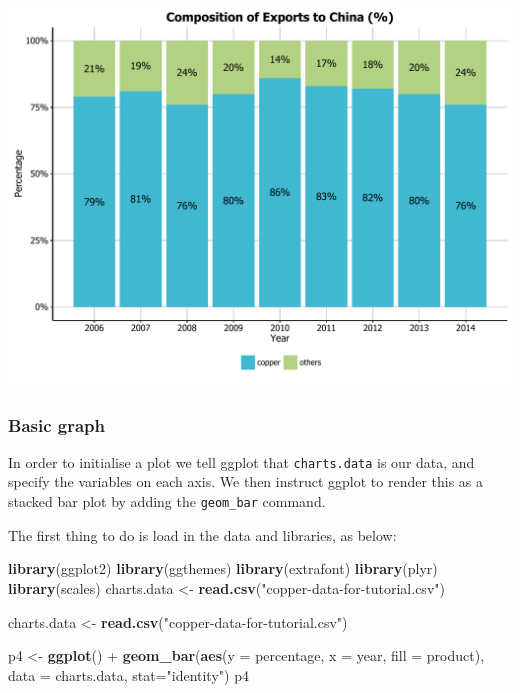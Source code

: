 \documentclass[]{article}
\newenvironment{Shaded}{\begin{snugshade}}{\end{snugshade}}
\newcommand{\KeywordTok}[1]{\textcolor[rgb]{0.13,0.29,0.53}{\textbf{{#1}}}}
\newcommand{\DataTypeTok}[1]{\textcolor[rgb]{0.13,0.29,0.53}{{#1}}}
\newcommand{\StringTok}[1]{\textcolor[rgb]{0.31,0.60,0.02}{{#1}}}
\newcommand{\NormalTok}[1]{{#1}}
\begin{document}
\begin{center}\includegraphics{0_all_posts_pdf/stacked_finalresult-1} \end{center}

\subsubsection{Basic graph}\label{basic-graph-3}

In order to initialise a plot we tell ggplot that \texttt{charts.data}
is our data, and specify the variables on each axis. We then instruct
ggplot to render this as a stacked bar plot by adding the
\texttt{geom\_bar} command.

The first thing to do is load in the data and libraries, as below:

\begin{Shaded}
\begin{Highlighting}[]
\KeywordTok{library}\NormalTok{(ggplot2)}
\KeywordTok{library}\NormalTok{(ggthemes)}
\KeywordTok{library}\NormalTok{(extrafont)}
\KeywordTok{library}\NormalTok{(plyr)}
\KeywordTok{library}\NormalTok{(scales)}
\NormalTok{charts.data <-}\StringTok{ }\KeywordTok{read.csv}\NormalTok{(}\StringTok{"copper-data-for-tutorial.csv"}\NormalTok{)}
\end{Highlighting}
\end{Shaded}

\begin{Shaded}
\begin{Highlighting}[]
\NormalTok{charts.data <-}\StringTok{ }\KeywordTok{read.csv}\NormalTok{(}\StringTok{"copper-data-for-tutorial.csv"}\NormalTok{)}

\NormalTok{p4 <-}\StringTok{ }\KeywordTok{ggplot}\NormalTok{() +}\StringTok{ }\KeywordTok{geom_bar}\NormalTok{(}\KeywordTok{aes}\NormalTok{(}\DataTypeTok{y =} \NormalTok{percentage, }\DataTypeTok{x =} \NormalTok{year, }\DataTypeTok{fill =} \NormalTok{product), }\DataTypeTok{data =} \NormalTok{charts.data, }
                          \DataTypeTok{stat=}\StringTok{"identity"}\NormalTok{)}
\NormalTok{p4}
\end{Highlighting}
\end{Shaded}
\end{document}
